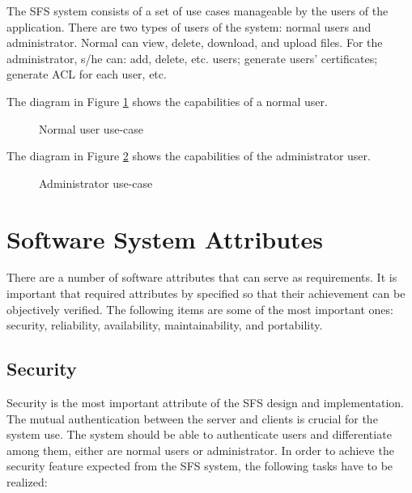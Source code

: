 The SFS system consists of a set of use cases manageable by the
users of the application. There are two types of users of the
system: normal users and administrator. Normal can view, delete,
download, and upload files. For the administrator, s/he can: add,
delete, etc. users; generate users' certificates; generate ACL for
each user, etc.

The diagram in Figure \ref{useuse} shows the capabilities of a
normal user.

\begin{figure}[htbp]
\begin{center}
    \caption{\label{useuse} Normal user use-case}
\end{center}
\end{figure}

\newpage
The diagram in Figure \ref{servuse} shows the capabilities of the
administrator user.

\begin{figure}[htbp]
\begin{center}
    \caption{\label{servuse} Administrator use-case}
\end{center}
\end{figure}



\section{Software System Attributes}

There are a number of software attributes that can serve as
requirements.  It is important that required attributes by specified
so that their achievement can be objectively verified. The following
items are some of the most important ones: security, reliability,
availability, maintainability, and portability.

\subsection{Security}

Security is the most important attribute of the SFS design and
implementation. The mutual authentication between the server and
clients is crucial for the system use. The system should be able to
authenticate users and differentiate among them, either are normal
users or administrator. In order to achieve the security feature
expected from the SFS system, the following tasks have to be
realized:

